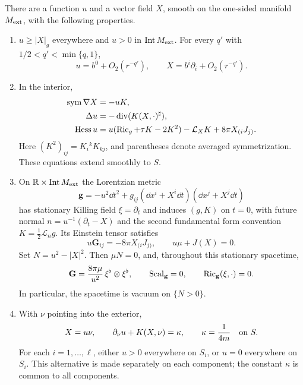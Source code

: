 \begin{proposition}
\label{q3:variation:adjoint}
There are a function $u$ and a vector field $X$, smooth on the
one-sided manifold $M_{\mathrm{ext}}$, with the following properties.
\begin{enumerate}
 \item $u\ge |X|_g$ everywhere and $u>0$ in $\operatorname{Int}M_{\mathrm{ext}}$.
 For every $q'$ with $1/2<q'<\min\{q,1\}$,
 \begin{equation}
  u=b^0+O_2(r^{-q'}),\qquad
  X=b^i\partial_i+O_2(r^{-q'}).
  \label{q3:variation:asymptote}
 \end{equation}
 \item In the interior,
 \begin{align}
  \operatorname{sym}\nabla X&=-uK,\label{q3:variation:kid-first}\\
  \Delta u&=-\operatorname{div}(K(X,\cdot)^\sharp),
    \label{q3:variation:lapse-divergence}\\
  \operatorname{Hess} u
   &=u(\operatorname{Ric}_g+\tau K-2K^2)-\mathcal L_XK
       +8\pi X_{(i}J_{j)}.
    \label{q3:variation:kid-second}
 \end{align}
 Here $(K^2)_{ij}=K_i{}^kK_{kj}$, and parentheses denote averaged
 symmetrization.  These equations extend smoothly to $S$.
 \item On $\mathbb R\times\operatorname{Int}M_{\mathrm{ext}}$ the Lorentzian metric
 \begin{equation}
  \mathbf g=-u^2\dd t^2
       +g_{ij}(\dd x^i+X^i\dd t)(\dd x^j+X^j\dd t)
  \label{q3:variation:stationary-metric}
 \end{equation}
 has stationary Killing field $\xi=\partial_t$ and induces $(g,K)$
 on $t=0$, with future normal $n=u^{-1}(\partial_t-X)$ and the
 second fundamental form convention $K=\frac12\mathcal L_n g$.
 Its Einstein tensor satisfies
 \begin{equation}
  u\mathbf G_{ij}=-8\pi X_{(i}J_{j)},\qquad
  u\mu+J(X)=0.
  \label{q3:variation:einstein-spatial}
 \end{equation}
 Set $N=u^2-|X|^2$.  Then $\mu N=0$, and, throughout this stationary
 spacetime,
 \begin{equation}
  \mathbf G=
    \frac{8\pi\mu}{u^2}\,\xi^\flat\otimes\xi^\flat,
  \qquad \operatorname{Scal}_{\mathbf g}=0,
  \qquad \operatorname{Ric}_{\mathbf g}(\xi,\cdot)=0.
  \label{q3:variation:null-dust}
 \end{equation}
 In particular, the spacetime is vacuum on $\{N>0\}$.
 \item With $\nu$ pointing into the exterior,
 \begin{equation}
  X=u\nu,\qquad
  \partial_\nu u+K(X,\nu)=\kappa,\qquad
  \kappa=\frac1{4m}
  \quad\hbox{on }S.
  \label{q3:variation:boundary-data}
 \end{equation}
 For each $i=1,\ldots,\ell$, either $u>0$ everywhere on $S_i$,
 or $u=0$ everywhere on $S_i$.  This alternative is made separately
 on each component; the constant $\kappa$ is common to all components.
\end{enumerate}
\end{proposition}

